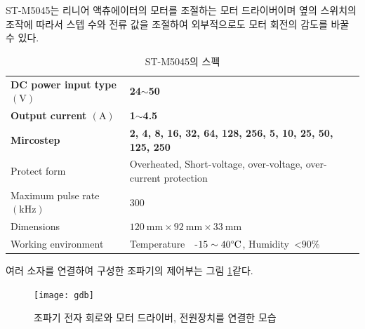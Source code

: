 ST-M5045는 리니어 액츄에이터의 모터를 조절하는 모터 드라이버이며 옆의 스위치의 조작에 따라서 스텝 수와 전류 값을 조절하여 외부적으로도 모터 회전의 감도를 바꿀 수 있다.

\begin{table}[H]
    \centering
    \captionsetup{justification=centering}
    \caption{ST-M5045의 스펙}
    \begin{tabular}{ll}
        \hline
        \textbf{DC power input type $(\mathrm{V})$}  & \textbf{24$\sim$50}      \\
        \textbf{Output current $(\mathrm{A})$}       & \textbf{1$\sim$4.5}      \\
        \textbf{Mircostep}           & \textbf{2, 4, 8, 16, 32, 64, 128, 256, 5, 10, 25, 50, 125, 250               }                \\
        Protect form        & Overheated, Short-voltage, over-voltage, over-current protection \\
        Maximum pulse rate $(\mathrm{kHz})$ & 300             \\
        Dimensions               & $120\mathrm{~mm} \times92\mathrm{~mm}\times33\mathrm{~mm}$ \\
        Working environment & Temperature~~-$15\sim40\mathrm{\degree C}$, Humidity~\textless{}$90\%$ \\ 
        \hline
    \end{tabular}
    \label{Specification of ST-M5045}
\end{table}

여러 소자를 연결하여 구성한 조파기의 제어부는 그림 \ref{Wavemaker}\와 같다.

\begin{figure}[H]
	\begin{center}
		\texttt{[image: gdb]}
		\caption{조파기 전자 회로와 모터 드라이버, 전원장치를 연결한 모습}
		\label{Wavemaker}
	\end{center}
\end{figure}





